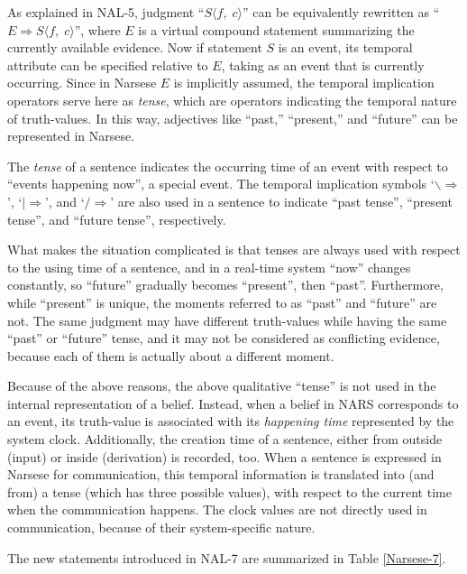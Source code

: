 As explained in NAL-5, judgment ``\(S \langle f, \; c \rangle\)'' can be equivalently rewritten as ``\(E \Rightarrow S \langle f, \; c \rangle\)'', where $E$ is a virtual compound statement summarizing the currently available evidence. Now if statement $S$ is an event, its temporal attribute can be specified relative to $E$, taking as an event that is currently occurring. Since in Narsese $E$ is implicitly assumed, the temporal implication operators serve here as \emph{tense}, which are operators indicating the temporal nature of truth-values. In this way, adjectives like ``past,'' ``present,'' and ``future'' can be represented in Narsese.
\begin{defi}
The \emph{tense} of a sentence indicates the occurring time of an event with respect to ``events happening now'', a special event. The temporal implication symbols `\(\backslash\!\!\!\Rightarrow\!\)', `\(|\!\!\!\Rightarrow\!\)', and `\(/\!\!\!\Rightarrow\!\)' are also used in a sentence to indicate ``past tense'', ``present tense'', and ``future tense'', respectively.
\end{defi}

What makes the situation complicated is that tenses are always used with respect to the using time of a sentence, and in a real-time system ``now'' changes constantly, so ``future'' gradually becomes ``present'', then ``past''. Furthermore, while ``present'' is unique, the moments referred to as ``past'' and ``future'' are not.  The same judgment may have different truth-values while having the same ``past'' or ``future'' tense, and it may not be considered as conflicting evidence, because each of them is actually about a different moment. 

Because of the above reasons, the above qualitative ``tense'' is not used in the internal representation of a belief. Instead, when a belief in NARS corresponds to an event, its truth-value is associated with its \emph{happening time} represented by the system clock. Additionally, the creation time of a sentence, either from outside (input) or inside (derivation) is recorded, too. When a sentence is expressed in Narsese for communication, this temporal information is translated into (and from) a tense (which has three possible values), with respect to the current time when the communication happens. The clock values are not directly used in communication, because of their system-specific nature.

The new statements introduced in NAL-7 are summarized in Table \ref{Narsese-7}.

